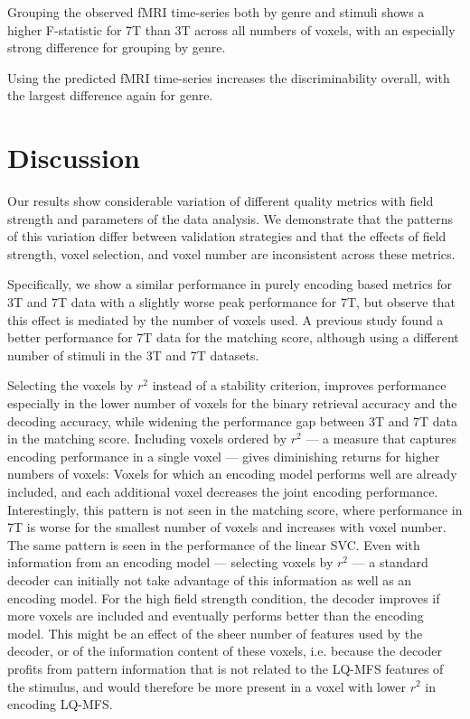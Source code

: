 Grouping the observed f{MRI} time-series both by genre and stimuli shows a
higher F-statistic for 7T than 3T across all numbers of voxels, with an
especially strong difference for grouping by genre.

Using the predicted f{MRI} time-series increases the discriminability overall,
with the largest difference again for genre.

\section*{Discussion}

Our results show considerable variation of different quality metrics with
field strength and parameters of the data analysis. We demonstrate that the
patterns of this variation differ between validation strategies and that the
effects of field strength, voxel selection, and voxel number are inconsistent
across these metrics.

Specifically, we show a similar performance in purely encoding based metrics
for 3T and 7T data with a slightly worse peak performance for 7T, but
observe that this effect is mediated by the number of voxels used. A previous
study \citep{SF14} found a better performance for 7T data for the matching
score, although using a different number of stimuli in the 3T and 7T
datasets. 

Selecting the voxels by $r^2$ instead of a stability criterion, improves
performance especially in the lower number of voxels for the binary retrieval
accuracy and the decoding accuracy, while widening the performance gap between
3T and 7T data in the matching score. Including voxels ordered by $r^2$
--- a measure that captures encoding performance in a single voxel --- gives
diminishing returns for higher numbers of voxels: Voxels for which an encoding
model performs well are already included, and each additional voxel decreases
the joint encoding performance.  Interestingly, this pattern is not seen in the
matching score, where performance in 7T is worse for the smallest number
of voxels and increases with voxel number. The same pattern is seen in the
performance of the linear SVC. Even with information from an encoding model ---
selecting voxels by $r^2$ --- a standard decoder can initially not take
advantage of this information as well as an encoding model. For the high field
strength condition, the decoder improves if more voxels are included and
eventually performs better than the encoding model. This might be an effect of
the sheer number of features used by the decoder, or of the information content
of these voxels, i.e. because the decoder profits from pattern information that
is not related to the LQ-MFS features of the stimulus, and would therefore be
more present in a voxel with lower $r^2$ in encoding LQ-MFS.

